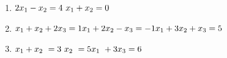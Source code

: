 \documentclass[10pt,]{book}
\theoremstyle{plain}
\theoremstyle{definition}
\theoremstyle{definition}
\theoremstyle{definition}
\theoremstyle{definition}
\begin{document}
\begin{exercisegroup}
\begin{enumerate}[label=\alph*]
\begin{multicols}{2}
\begin{enumerate}[label=\roman*]
\item\hypertarget{li-37}{}  \(2 x_1- x_2= 4\\
				\\
				\text{   }x_1+ x_2= 0\)%
\item\hypertarget{li-38}{}  \(x_1+ x_2+ 2 x_3= 1\\
				\\
				x_1+ 2 x_2-x_3= -1\\
				\\
				x_1+ 3 x_2+x_3= 5\)%
\item\hypertarget{li-39}{}  \(x_1+x_2\text{             }= 3\\
				\\
				\text{          }x_2\text{              }= 5\\
				\\
				x_1\text{         }+ 3x_3= 6\)
\end{enumerate}
\end{multicols}


\end{enumerate}
\end{exercisegroup}
\end{document}
